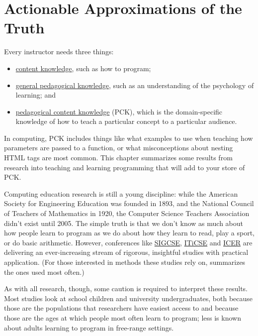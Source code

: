 \chapter{Actionable Approximations of the Truth}\label{s:pck}

Every instructor needs three things:

\begin{itemize}
\item
  \protect\hyperlink{g:content-knowledge}{content knowledge}, such as how to
  program;
\item
  \protect\hyperlink{g:general-pedagogical-knowledge}{general pedagogical knowledge},
  such as an understanding of the psychology of learning; and
\item
  \protect\hyperlink{g:pedagogical-content-knowledge}{pedagogical content knowledge}
  (PCK), which is the domain-specific knowledge of how to teach a
  particular concept to a particular audience.
\end{itemize}

In computing, PCK includes things like what examples to use when
teaching how parameters are passed to a function, or what misconceptions
about nesting HTML tags are most common. This chapter summarizes some
results from research into teaching and learning programming that will
add to your store of PCK.

Computing education research is still a young discipline: while the
American Society for Engineering Education was founded in 1893, and
the National Council of Teachers of Mathematics in 1920, the Computer
Science Teachers Association didn't exist until 2005. The simple truth
is that we don't know as much about how people learn to program as we
do about how they learn to read, play a sport, or do basic arithmetic.
However, conferences like \href{http://sigcse.org/}{SIGCSE}, \href{http://iticse.acm.org/}{ITiCSE} and
\href{https://icer.hosting.acm.org}{ICER} are delivering an ever-increasing stream of rigorous,
insightful studies with practical application. (For those interested
in methods these studies rely on, \cite{Ihan2016} summarizes the
ones used most often.)

As with all research, though, some caution is required to interpret
these results. Most studies look at school children and university
undergraduates, both because those are the populations that researchers
have easiest access to \cite{Henr2010} and because those are the ages
at which people most often learn to program; less is known about adults
learning to program in free-range settings.

